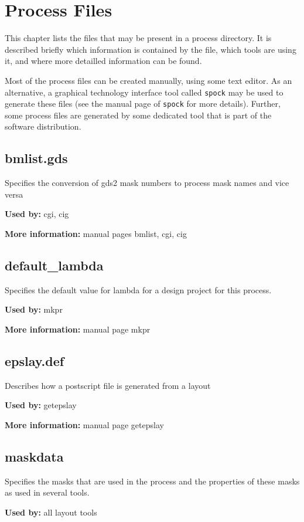 \chapter{Process Files}

This chapter lists the files that may be present in a process directory.
It is described briefly which information is contained by the file,
which tools are using it, and where more detailled information can be found.

Most of the process files can be created manually, using some text editor.
As an alternative, a graphical technology interface tool called \texttt{spock}
may be used to generate these files (see the manual page of \texttt{spock} 
for more details).
Further, some process files are generated by some dedicated tool
that is part of the software distribution.

\section{bmlist.gds}   
Specifies the conversion of gds2 mask numbers to process mask 
names and vice versa 

\textbf{Used by:} cgi, cig

\textbf{More information:} manual pages bmlist, cgi, cig

\section{default\_lambda}
Specifies the default value for lambda for a design project
for this process.

\textbf{Used by:} mkpr

\textbf{More information:} manual page mkpr

\section{epslay.def}
Describes how a postscript file is generated from a layout 

\textbf{Used by:} getepslay

\textbf{More information:} manual page getepslay

\section{maskdata}
Specifies the masks that are used in the process and the 
properties of these masks as used in several tools.

\textbf{Used by:} all layout tools

